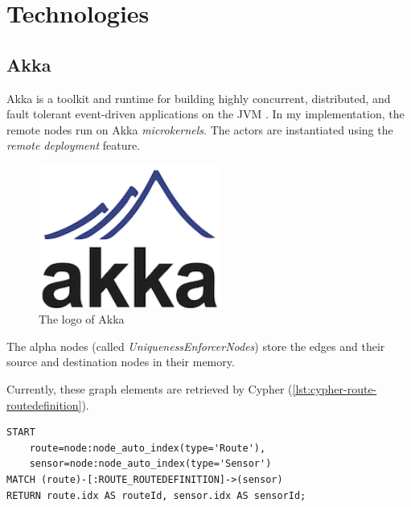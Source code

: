 \section{Technologies}

\subsection{Akka}

Akka is a toolkit and runtime for building highly concurrent, distributed, and fault tolerant event-driven applications on the JVM \cite{akka}. In my implementation, the remote nodes run on Akka \textit{microkernels}. The actors are instantiated using the \textit{remote deployment} feature.

\begin{figure}
\begin{center}
\includegraphics[width=6cm]{figures/akka-logo}
\caption{The logo of Akka}
\label{fig:akka-logo}
\end{center}
\end{figure}

The alpha nodes (called \textit{UniquenessEnforcerNodes}) store the edges and their source and destination nodes in their memory.

Currently, these graph elements are retrieved by Cypher (\autoref{lst:cypher-route-routedefinition}).

\begin{lstlisting}[caption=Cypher query to retrieve all \texttt{ROUTE\_ROUTEDEFINITION} edges, label=lst:cypher-route-routedefinition, breaklines=true]
START
    route=node:node_auto_index(type='Route'),
    sensor=node:node_auto_index(type='Sensor')
MATCH (route)-[:ROUTE_ROUTEDEFINITION]->(sensor)
RETURN route.idx AS routeId, sensor.idx AS sensorId;
\end{lstlisting}

